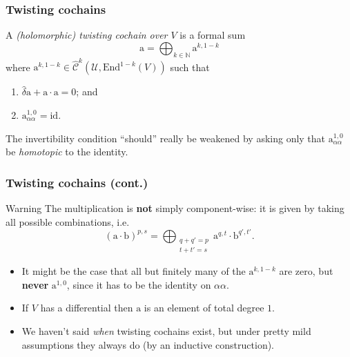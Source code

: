 \documentclass{beamer}
\begin{document}
        \begin{frame}\frametitle{Twisting cochains}
            \begin{definition}
                A \emph{(holomorphic) twisting cochain over $V$} is a formal sum
                \begin{equation*}
                    \mathrm{a} = \bigoplus_{k\in\mathbb{N}} \mathrm{a}^{k,1-k}
                \end{equation*}
                where $\mathrm{a}^{k,1-k}\in\hat{\mathscr{C}}^k(\mathcal{U},\mathrm{End}^{1-k}(V))$ such that
                \begin{enumerate}
                    \item $\hat{\delta}\mathrm{a} + \mathrm{a}\cdot\mathrm{a} = 0$; and
                    \item $\mathrm{a}_{\alpha\alpha}^{1,0}=\mathrm{id}$.
                \end{enumerate}
            \end{definition}

            \pause

            The invertibility condition ``should'' really be weakened by asking only that $\mathrm{a}_{\alpha\alpha}^{1,0}$ be \emph{homotopic} to the identity.
        \end{frame}

        \begin{frame}\frametitle{Twisting cochains (cont.)}
            \begin{alertblock}{Warning}
                The multiplication is \textbf{not} simply component-wise: it is given by taking all possible combinations, i.e.
                \begin{equation*}
                    (\mathrm{a}\cdot\mathrm{b})^{p,s} = \bigoplus_{\substack{q+q'=p\\t+t'=s}} \mathrm{a}^{q,t}\cdot\mathrm{b}^{q',t'}.
                \end{equation*}
            \end{alertblock}

            \pause
            
            \begin{itemize}
                \item It might be the case that all but finitely many of the $\mathrm{a}^{k,1-k}$ are zero, but \textbf{never} $\mathrm{a}^{1,0}$, since it has to be the identity on $\alpha\alpha$.
                \pause
                \item If $V$ has a differential then $\mathrm{a}$ is an element of total degree $1$.
                \pause
                \item We haven't said \emph{when} twisting cochains exist, but under pretty mild assumptions they always do (by an inductive construction).
            \end{itemize}
        \end{frame}
\end{document}
